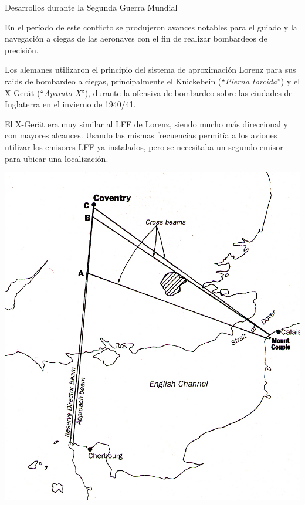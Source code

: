  \begin{myboxRojo}{Desarrollos durante la Segunda Guerra Mundial}

   {\footnotesize   

     \begin{minipage}[c]{0.65\linewidth}

     En el período de este conflicto se produjeron avances notables para el guiado y la navegaci\'on a ciegas de las aeronaves con el fin de realizar bombardeos de precisi\'on. 

Los alemanes utilizaron el principio del sistema de aproximación Lorenz para sus raids de bombardeo a ciegas, principalmente el 
Knickebein (``\emph{Pierna torcida}'') y el X-Ger\"{a}t (``\emph{Aparato-X}''),
durante la ofensiva de bombardeo sobre las ciudades de Inglaterra en el 
invierno de 1940/41.

El X-Ger\"{a}t era muy similar al LFF de Lorenz, siendo mucho m\'as direccional y con mayores alcances. Usando las mismas frecuencias permit\'ia a los aviones utilizar los emisores LFF ya instalados, pero se necesitaba un segundo emisor para ubicar una localizaci\'on.


\end{minipage}
\begin{minipage}[c]{0.35\linewidth}
  \centering
\includegraphics[width=0.9\linewidth]{06.radionavegacion/Imagenes/06.02.vor.imagenes/sottisville-x-geret.jpg}
\label{fig:Xgerat}
\end{minipage}


}
\end{myboxRojo}

